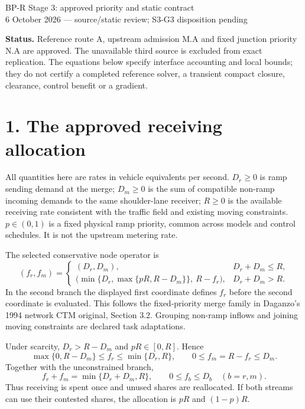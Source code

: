 \documentclass[11pt,a4paper]{article}
\begin{document}
{\Large BP-R Stage 3: approved priority and static contract}\\[4pt]
6 October 2026 --- source/static review; S3-G3 disposition pending

\textbf{Status.} Reference route A, upstream admission M.A and fixed junction
priority N.A are approved. The unavailable third source is excluded from exact
replication. The equations below specify interface accounting and local bounds;
they do not certify a completed reference solver, a transient compact closure,
clearance, control benefit or a gradient.

\section*{1. The approved receiving allocation}
All quantities here are rates in vehicle equivalents per second.
$D_r\ge0$ is ramp sending demand at the merge; $D_m\ge0$ is the sum of compatible
non-ramp incoming demands to the same shoulder-lane receiver; $R\ge0$ is the
available receiving rate consistent with the traffic field and existing moving
constraints. $p\in(0,1)$ is a fixed physical ramp priority, common across models
and control schedules. It is not the upstream metering rate.

The selected conservative node operator is
\begin{equation}
(f_r,f_m)=
\begin{cases}
(D_r,D_m),&D_r+D_m\le R,\\
\bigl(\min\{D_r,\max\{pR,R-D_m\}\},\ R-f_r\bigr),&D_r+D_m>R.
\end{cases}
\end{equation}
In the second branch the displayed first coordinate defines $f_r$ before the
second coordinate is evaluated. This follows the fixed-priority merge family
in Daganzo's 1994 network CTM original, Section 3.2. Grouping non-ramp inflows
and joining moving constraints are declared task adaptations.

Under scarcity, $D_r>R-D_m$ and $pR\in[0,R]$. Hence
\begin{equation}
\max\{0,R-D_m\}\le f_r\le\min\{D_r,R\},\qquad
0\le f_m=R-f_r\le D_m.
\end{equation}
Together with the unconstrained branch,
\begin{equation}
f_r+f_m=\min\{D_r+D_m,R\},\qquad 0\le f_b\le D_b\quad(b=r,m).
\end{equation}
Thus receiving is spent once and unused shares are reallocated. If both streams
can use their contested shares, the allocation is $pR$ and $(1-p)R$.
\end{document}
